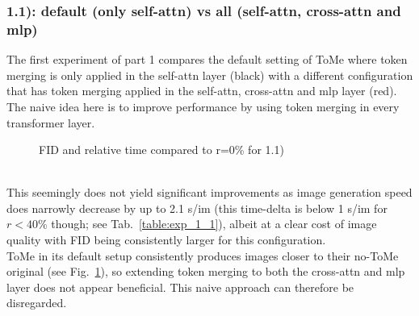 \subsubsection*{1.1): default (only self-attn) vs all (self-attn, cross-attn and mlp)}
The first experiment of part 1 compares the default setting of ToMe where token merging is only applied in the self-attn layer (black) with a different configuration that has token merging applied in the self-attn, cross-attn and mlp layer (red). 
The naive idea here is to improve performance by using token merging in every transformer layer.
\begin{figure}[!htb]
\label{fig:exp_1_1}
   
   
\caption{FID and relative time compared to r=0\% for 1.1)}
\label{fig:exp_1_1}
\end{figure}\\
This seemingly does not yield significant improvements as image generation speed does narrowly decrease by up to 2.1 s/im (this time-delta is below 1 s/im for $r<40\%$ though; see Tab.~\ref{table:exp_1_1}), albeit at a clear cost of image quality with FID being consistently larger for this configuration. \\
ToMe in its default setup consistently produces images closer to their no-ToMe original (see Fig.~\ref{fig:exp_1_1}), so extending token merging to both the cross-attn and mlp layer does not appear beneficial. This naive approach can therefore be disregarded.



